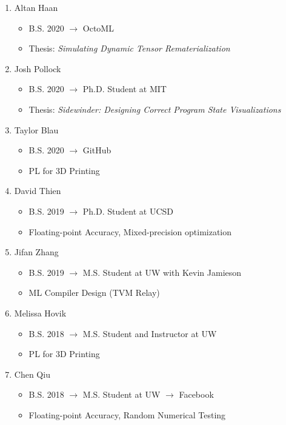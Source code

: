 \documentclass[10pt]{article}
\begin{document}
\begin{enumerate}[resume]
  \item Altan Haan
    \begin{itemize}
      \item B.S. 2020 $\rightarrow$ OctoML
      \item Thesis: \textit{Simulating Dynamic Tensor Rematerialization}
    \end{itemize}

  \item Josh Pollock
    \begin{itemize}
      \item B.S. 2020 $\rightarrow$ Ph.D. Student at MIT
      \item Thesis: \textit{Sidewinder: Designing Correct Program State Visualizations}
    \end{itemize}

  \item Taylor Blau
    \begin{itemize}
      \item B.S. 2020 $\rightarrow$ GitHub
      \item PL for 3D Printing
    \end{itemize}

  \item David Thien
    \begin{itemize}
      \item B.S. 2019 $\rightarrow$ Ph.D. Student at UCSD
      \item Floating-point Accuracy, Mixed-precision optimization
    \end{itemize}

  \item Jifan Zhang
    \begin{itemize}
      \item B.S. 2019 $\rightarrow$ M.S. Student at UW with Kevin Jamieson
      \item ML Compiler Design (TVM Relay)
    \end{itemize}

  \item Melissa Hovik
    \begin{itemize}
      \item B.S. 2018 $\rightarrow$ M.S. Student and Instructor at UW
      \item PL for 3D Printing
    \end{itemize}

  \item Chen Qiu
    \begin{itemize}
      \item B.S. 2018 $\rightarrow$ M.S. Student at UW
                      $\rightarrow$ Facebook
      \item Floating-point Accuracy, Random Numerical Testing
    \end{itemize}


\end{enumerate}
\end{document}
